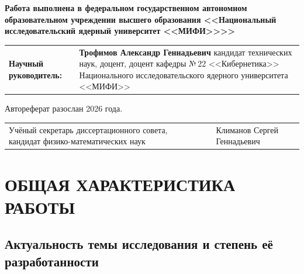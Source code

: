 \documentclass[12pt,a5paper]{article}
\begin{document}
{\scriptsize
\begin{center}
\textbf{Работа выполнена в федеральном государственном автономном
образовательном учреждении высшего образования
<<Национальный исследовательский ядерный университет <<МИФИ>>{}>>}
\end{center}

\vspace{0.15cm}

\noindent\begin{tabular}{@{}p{2.8cm}p{7.4cm}@{}}
\textbf{Научный руководитель:} & \textbf{Трофимов Александр Геннадьевич} \newline
кандидат технических наук, доцент, доцент кафедры №\,22 <<Кибернетика>> Национального исследовательского ядерного университета <<МИФИ>> \\
\end{tabular}

\vspace{10.0cm}



\noindent Автореферат разослан \underline{\hspace{2.5cm}} 2026 года.

\vspace{0.2cm}

\noindent\begin{tabular}{@{}p{4.2cm}p{2cm}p{3.5cm}@{}}
Учёный секретарь диссертационного совета, кандидат физико-математических наук & & Климанов Сергей Геннадьевич \\
\end{tabular}
}

\newpage

\setcounter{page}{3}

\section*{ОБЩАЯ ХАРАКТЕРИСТИКА РАБОТЫ}

\subsection*{Актуальность темы исследования и степень её разработанности}
\end{document}
